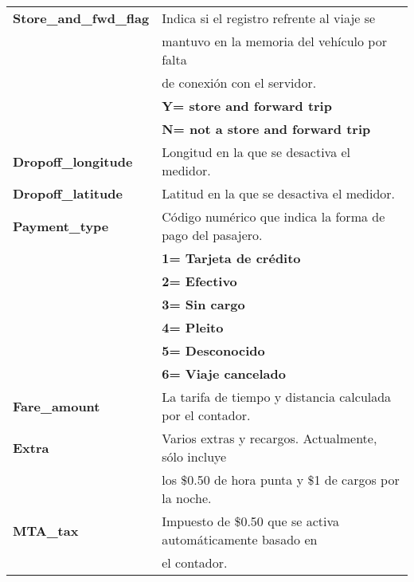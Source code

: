 \begin{table}[h!]
\begin{tabular}{|l||l|}
		\hline
		 
		\textbf{Store\_and\_fwd\_flag} & Indica si el registro refrente al viaje se \\
		                               & mantuvo en la memoria del vehículo por falta \\
		                               & de conexión con el servidor. \\
					                   & \textbf{Y= store and forward trip} \\
						               & \textbf{N= not a store and forward trip} \\
	
		
		\hline
		 
		\textbf{Dropoff\_longitude} & Longitud en la que se desactiva el medidor. \\
		
		\hline
		 
		\textbf{Dropoff\_latitude} & Latitud en la que se desactiva el medidor. \\
		
		\hline
		
		\textbf{Payment\_type} &  Código numérico que indica la forma de pago del pasajero. \\
					           & \textbf{1= Tarjeta de crédito} \\
					           & \textbf{2= Efectivo} \\
					           & \textbf{3= Sin cargo} \\
					           & \textbf{4= Pleito} \\
					           & \textbf{5= Desconocido} \\
					           & \textbf{6= Viaje cancelado} \\
		
		\hline
		 
		\textbf{Fare\_amount} & La tarifa de tiempo y distancia calculada por el contador. \\
		
		\hline
		
		\textbf{Extra} & Varios extras y recargos. Actualmente, sólo incluye \\
		               & los \$0.50 de hora punta y \$1 de cargos por la noche. \\
		
		\hline
		 
		\textbf{MTA\_tax} & Impuesto de \$0.50 que se activa automáticamente basado en \\
		                  & el contador. \\
		

\end{tabular}
\end{table}
